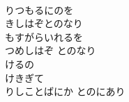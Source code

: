 \documentclass[10pt,b5j]{tarticle} %
\begin{document}
\begin{enumerate}
\begin{minipage}[c]{\blocksize}
    \end{minipage}
    \begin{minipage}[c]{\blocksize}
        
        \vspace{\linespace}
        \item~\\
        りつもるにのを\\
        きしはぞとのなり\\
        もすがらいれるを\\
        つめしはぞ
        とのなり\\
        けるの\\
        けきぎて\\
        りしことばにか
        とのにあり
    
    \end{minipage}
\end{enumerate} %
\end{document}
